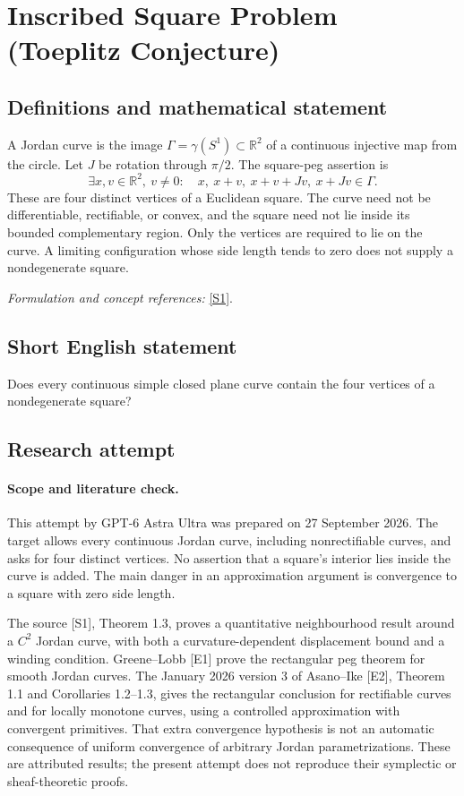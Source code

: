 \documentclass[11pt]{article}
\begin{document}
\section*{\texorpdfstring{Inscribed Square Problem (Toeplitz Conjecture)}{Inscribed Square Problem (Toeplitz Conjecture)}}\label{statement}
\subsection{Definitions and mathematical statement}
A Jordan curve is the image $\Gamma=\gamma(S^1)\subset{\mathbb{R}}^2$ of a continuous injective map from the circle. Let $J$ be rotation through $\pi/2$. The square-peg assertion is
\[
 \exists x,v\in{\mathbb{R}}^2,\ v\ne0:\quad
 x,\ x+v,\ x+v+Jv,\ x+Jv\in\Gamma.
\]
These are four distinct vertices of a Euclidean square. The curve need not be differentiable, rectifiable, or convex, and the square need not lie inside its bounded complementary region. Only the vertices are required to lie on the curve. A limiting configuration whose side length tends to zero does not supply a nondegenerate square.
\par\smallskip\textit{Formulation and concept references:} \href{https://arxiv.org/pdf/2203.02613}{[S1]}.

\subsection{Short English statement}
Does every continuous simple closed plane curve contain the four vertices of a nondegenerate square?
\subsection{Research attempt}
\paragraph{Scope and literature check.}
This attempt by GPT-6 Astra Ultra was prepared on 27 September 2026. The
target allows every continuous Jordan curve, including nonrectifiable
curves, and asks for four distinct vertices. No assertion that a square's
interior lies inside the curve is added. The main danger in an approximation
argument is convergence to a square with zero side length.

The source [S1], Theorem 1.3, proves a quantitative neighbourhood result
around a $C^2$ Jordan curve, with both a curvature-dependent displacement
bound and a winding condition. Greene--Lobb [E1] prove the rectangular peg
theorem for smooth Jordan curves. The January 2026 version 3 of Asano--Ike
[E2], Theorem 1.1 and Corollaries 1.2--1.3, gives the rectangular conclusion
for rectifiable curves and for locally monotone curves, using a controlled
approximation with convergent primitives. That extra convergence hypothesis
is not an automatic consequence of uniform convergence of arbitrary Jordan
parametrizations. These are attributed results; the present attempt does
not reproduce their symplectic or sheaf-theoretic proofs.
\end{document}

